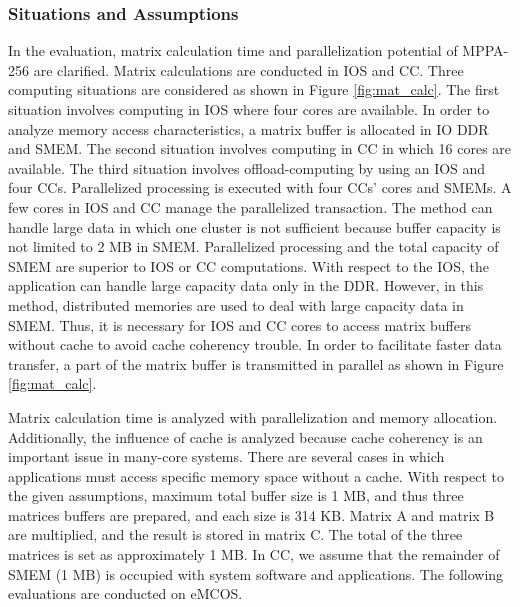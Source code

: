 \documentclass[conference,compsoc]{IEEEtran}
\begin{document}
\subsubsection{Situations and Assumptions}
\label{sec:situations_and_assumptions}
In the evaluation, matrix calculation time and parallelization potential of MPPA-256 are clarified.
Matrix calculations are conducted in IOS and CC.
Three computing situations are considered as shown in Figure \ref{fig:mat_calc}.
The first situation involves computing in IOS where four cores are available.
In order to analyze memory access characteristics, a matrix buffer is allocated in IO DDR and SMEM.
The second situation involves computing in CC in which 16 cores are available.
The third situation involves offload-computing by using an IOS and four CCs.
Parallelized processing is executed with four CCs' cores and SMEMs.
A few cores in IOS and CC manage the parallelized transaction.
The method can handle large data in which one cluster is not
sufficient because buffer capacity is not limited to 2 MB in SMEM.
Parallelized processing and the total capacity of SMEM are superior to IOS or CC computations. 
With respect to the IOS, the application can handle large capacity data only in the DDR.
However, in this method, distributed memories are used to deal with large capacity data in SMEM.
Thus, it is necessary for IOS and CC cores to access matrix buffers without cache to avoid cache coherency trouble.
In order to facilitate faster data transfer, a part of the matrix buffer is transmitted in parallel as shown in Figure \ref{fig:mat_calc}.

Matrix calculation time is analyzed with parallelization and memory allocation.
Additionally, the influence of cache is analyzed because cache coherency is an important issue in many-core systems.
There are several cases in which applications must access specific memory space without a cache.
With respect to the given assumptions, maximum total buffer size is 1 MB, and thus three matrices buffers are prepared, and each size is 314 KB.
Matrix A and matrix B are multiplied, and the result is stored in matrix C.
The total of the three matrices is set as approximately 1 MB.
In CC, we assume that the remainder of SMEM (1 MB) is occupied with system software and applications.
The following evaluations are conducted on eMCOS.
\end{document}
